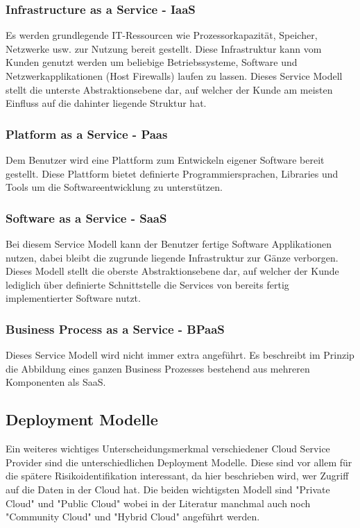 \documentclass{report}
\begin{document}
\subsubsection{Infrastructure as a Service - IaaS}
Es werden grundlegende IT-Ressourcen wie Prozessorkapazität, Speicher, Netzwerke usw. zur Nutzung bereit gestellt. Diese Infrastruktur kann vom Kunden genutzt werden um beliebige Betriebssysteme, Software und Netzwerkapplikationen (Host Firewalls) laufen zu lassen. Dieses Service Modell stellt die unterste Abstraktionsebene dar, auf welcher der Kunde am meisten Einfluss auf die dahinter liegende Struktur hat.

\subsubsection{Platform as a Service - Paas}
Dem Benutzer wird eine Plattform zum Entwickeln eigener Software bereit gestellt. Diese Plattform bietet definierte Programmiersprachen, Libraries und Tools um die Softwareentwicklung zu unterstützen.

\subsubsection{Software as a Service - SaaS}
Bei diesem Service Modell kann der Benutzer fertige Software Applikationen nutzen, dabei bleibt die zugrunde liegende Infrastruktur zur Gänze verborgen. Dieses Modell stellt die oberste Abstraktionsebene dar, auf welcher der Kunde lediglich über definierte Schnittstelle die Services von bereits fertig implementierter Software nutzt.

\subsubsection{Business Process as a Service - BPaaS}
Dieses Service Modell wird nicht immer extra angeführt. Es beschreibt im Prinzip die Abbildung eines ganzen Business Prozesses bestehend aus mehreren Komponenten als SaaS.

\subsection{Deployment Modelle}
Ein weiteres wichtiges Unterscheidungsmerkmal verschiedener Cloud Service Provider sind die unterschiedlichen Deployment Modelle. Diese sind vor allem für die spätere Risikoidentifikation interessant, da hier beschrieben wird, wer Zugriff auf die Daten in der Cloud hat. Die beiden wichtigsten Modell sind "Private Cloud" und "Public Cloud" wobei in der Literatur manchmal auch noch "Community Cloud" und "Hybrid Cloud" angeführt werden.
\end{document}
